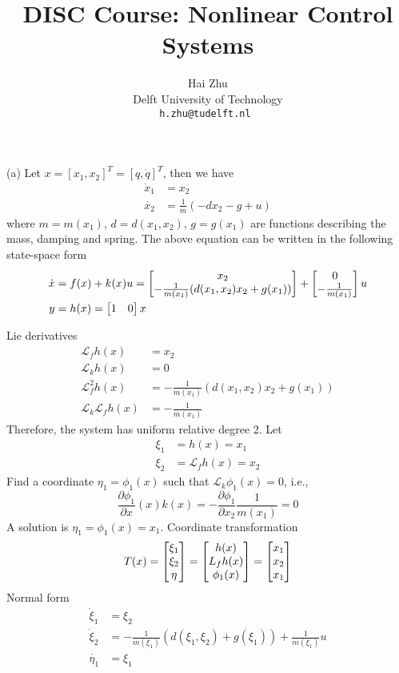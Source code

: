 \documentclass[a4 paper, 12pt]{article}
\title{
        \Large{DISC Course: Nonlinear Control Systems}\\
        \vspace{1em}
        \large\tb{Assignment 4}
}
\author{
        \small Hai Zhu                          \\
        \small Delft University of Technology   \\
        \tt\small h.zhu@tudelft.nl
 }
\date{\small\ti{\today}}
\begin{document}
\maketitle



 (a) Let $x = [x_1, x_2]^T = [q, \dot{q}]^T$, then we have
\begin{align}
        \dot{x}_1 &= x_2 \label{eq:1.x1} \\ 
        \dot{x_2} &= \frac{1}{m}(-dx_2 - g + u) \label{eq:1.x2}
\end{align}
where $m = m(x_1)$, $d = d(x_1,x_2)$, $g = g(x_1)$ are functions describing the mass, damping and spring. The above equation can be written in the following state-space form
\begin{align}
        \dot{x} &= f(x) + k(x)u = \begin{bmatrix} x_2 \\ -\frac{1}{m(x_1)}(d(x_1,x_2)x_2+g(x_1)) \end{bmatrix} + \begin{bmatrix} 0 \\ -\frac{1}{m(x_1)} \end{bmatrix} u \\
        y &= h(x) = \begin{bmatrix} 1 &0 \end{bmatrix} x
\end{align}

Lie derivatives
\begin{align}
        \mathcal{L}_fh(x) &= x_2 \\
        \mathcal{L}_kh(x) &= 0 \\
        \mathcal{L}_f^2h(x) &= -\frac{1}{m(x_1)}(d(x_1,x_2)x_2+g(x_1)) \\
        \mathcal{L}_k\mathcal{L}_fh(x) &= -\frac{1}{m(x_1)}
\end{align}
Therefore, the system has uniform relative degree 2. Let 
\begin{align}
        \xi_1 &= h(x) = x_1 \\
        \xi_2 &= \mathcal{L}_fh(x) = x_2
\end{align}
Find a coordinate $\eta_1 = \phi_1(x)$ such that $\mathcal{L}_k\phi_1(x)=0$, i.e., 
\begin{equation}
        \frac{\partial\phi_1}{\partial x}(x)k(x) = -\frac{\partial\phi_1}{\partial x_2}\frac{1}{m(x_1)} = 0
\end{equation}
A solution is $\eta_1 = \phi_1(x) = x_1$. Coordinate transformation
\begin{equation}
        T(x) = \begin{bmatrix} \xi_1 \\ \xi_2 \\ \eta \end{bmatrix} = \begin{bmatrix} h(x) \\ L_fh(x) \\ \phi_1(x) \end{bmatrix} = \begin{bmatrix} x_1 \\ x_2 \\ x_1 \end{bmatrix}
\end{equation}
Normal form
\begin{align}
        \dot{\xi}_1 &= \xi_2 \\
        \dot{\xi}_2 &= -\frac{1}{m(\xi_1)}(d(\xi_1,\xi_2)+g(\xi_1)) + \frac{1}{m(\xi_1)}u \\
        \dot{\eta_1} &= \xi_1
\end{align}
\end{document}
